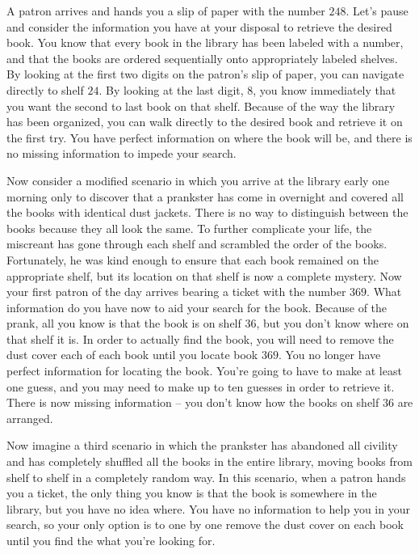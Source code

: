 \documentclass[11pt, oneside]{article}   	%
\begin{document}
A patron arrives and hands you a slip of paper with the number $248$. Let's
pause and consider the information you have at your disposal to retrieve the
desired book.  You know that every book in the library has been labeled with a
number, and that the books are ordered sequentially onto appropriately labeled
shelves.  By looking at the first two digits on the patron's slip of paper, you
can navigate directly to shelf $24$.  By looking at the last digit, $8$, you
know immediately that you want the second to last book on that shelf.  Because
of the way the library has been organized, you can walk directly to the desired
book and retrieve it on the first try.  You have perfect information on where
the book will be, and there is no missing information to impede your search.

Now consider a modified scenario in which you arrive at the library early one
morning only to discover that a prankster has come in overnight and covered all
the books with identical dust jackets.  There is no way to distinguish between
the books because they all look the same.  To further complicate your life, the
miscreant has gone through each shelf and scrambled the order of the books.
Fortunately, he was kind enough to ensure that each book remained on the
appropriate shelf, but its location on that shelf is now a complete mystery.
Now your first patron of the day arrives bearing a ticket with the number $369$.
What information do you have now to aid your search for the book.  Because of
the prank, all you know is that the book is on shelf $36$, but you don't
know where on that shelf it is.  In order to actually find the book, you will
need to remove the dust cover each of each book until you locate
book $369$.  You no longer have perfect information for locating the book.
You're going to have to make at least one guess, and you may need to make up to
ten guesses in order to retrieve it.  There is now missing information -- you
don't know how the books on shelf $36$ are arranged.

Now imagine a third scenario in which the prankster has abandoned all civility
and has completely shuffled all the books in the entire library, moving books
from shelf to shelf in a completely random way.  In this scenario, when a patron
hands you a ticket, the only thing you know is that the book is somewhere in the
library, but you have no idea where.  You have no information to help you in
your search, so your only option is to one by one remove the dust cover on each
book until you find the what you're looking for.
\end{document}
